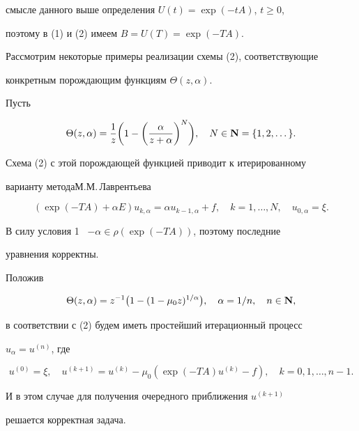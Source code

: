 смысле данного выше определения $U(t)=\exp(-tA)$, $t\geq 0$,


поэтому в (1) и (2) имеем $B=U(T)=\exp(-TA)$.





Рассмотрим некоторые примеры реализации схемы (2), соответствующие


конкретным порождающим функциям $\Theta(z,\alpha)$.








\begin{exam}


Пусть


$$


\Theta (z,\alpha) = \frac{1}{z} \bigg( 1 -


\bigg(\frac{\alpha}{z+\alpha}\bigg)^N\bigg), \quad N\in {\bold


N}=\{1,2,\dotsc\}.


$$


Схема (2) с этой порождающей функцией приводит к итерированному


варианту метода\linebreak М.М.\,Лаврентьева


$$


(\exp(-TA) + \alpha E) u_{k,\alpha} = \alpha u_{k-1,\alpha} + f,


\quad k=1,\dotsc,N,\quad u_{0,\alpha}=\xi.


$$


В силу условия 1 \ $-\alpha\in\rho(\exp(-TA))$, поэтому последние


уравнения корректны.


\end{exam}








\begin{exam}


Положив


$$


\Theta (z,\alpha) = {z}^{-1}\big(1 - (1-\mu_0z)^{1/\alpha}\big),


\quad\alpha=1/n,\quad n\in {\bold N},


$$


в соответствии с (2) будем иметь простейший итерационный процесс


$u_\alpha=u^{(n)}$, где


$$


u^{(0)} = \xi, \quad u^{(k+1)} = u^{(k)} - \mu_0(\exp(-TA)u^{(k)}


- f), \quad k =0, 1,\dotsc, n-1.


$$


И в этом случае для получения очередного приближения $u^{(k+1)}$


решается корректная задача.


\end{exam}





